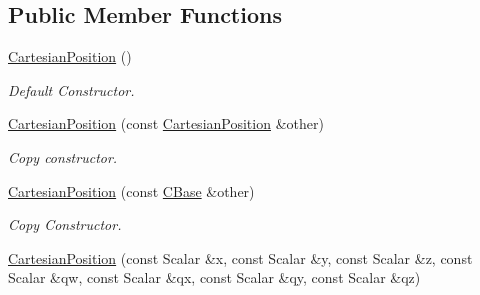 \subsection*{Public Member Functions}
\begin{DoxyCompactItemize}
\item 
\hyperlink{classow__core_1_1CartesianPosition_abcb76d25934535197e2c78f66d9389aa}{Cartesian\+Position} ()\hypertarget{classow__core_1_1CartesianPosition_abcb76d25934535197e2c78f66d9389aa}{}\label{classow__core_1_1CartesianPosition_abcb76d25934535197e2c78f66d9389aa}

\begin{DoxyCompactList}\small\item\em Default Constructor. \end{DoxyCompactList}\item 
\hyperlink{classow__core_1_1CartesianPosition_afc040f0b86f0e6938d9c6a3bf02b344d}{Cartesian\+Position} (const \hyperlink{classow__core_1_1CartesianPosition}{Cartesian\+Position} \&other)\hypertarget{classow__core_1_1CartesianPosition_afc040f0b86f0e6938d9c6a3bf02b344d}{}\label{classow__core_1_1CartesianPosition_afc040f0b86f0e6938d9c6a3bf02b344d}

\begin{DoxyCompactList}\small\item\em Copy constructor. \end{DoxyCompactList}\item 
\hyperlink{classow__core_1_1CartesianPosition_ad083c8650e75014378eda8954eb8f33e}{Cartesian\+Position} (const \hyperlink{classow__core_1_1CartesianBase}{C\+Base} \&other)\hypertarget{classow__core_1_1CartesianPosition_ad083c8650e75014378eda8954eb8f33e}{}\label{classow__core_1_1CartesianPosition_ad083c8650e75014378eda8954eb8f33e}

\begin{DoxyCompactList}\small\item\em Copy Constructor. \end{DoxyCompactList}\item 
\hyperlink{classow__core_1_1CartesianPosition_adab19102ef4ebb44b39c10842a550ccb}{Cartesian\+Position} (const Scalar \&x, const Scalar \&y, const Scalar \&z, const Scalar \&qw, const Scalar \&qx, const Scalar \&qy, const Scalar \&qz)\hypertarget{classow__core_1_1CartesianPosition_adab19102ef4ebb44b39c10842a550ccb}{}\label{classow__core_1_1CartesianPosition_adab19102ef4ebb44b39c10842a550ccb}


\end{DoxyCompactItemize}
